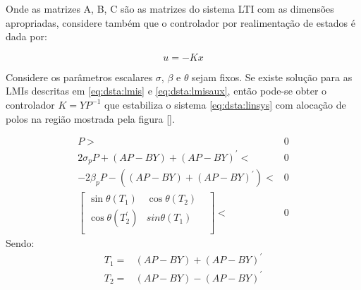 Onde as matrizes A, B, C são as matrizes do sistema LTI com as dimensões apropriadas, considere também que o controlador por realimentação de estados é dada por:

\begin{equation}
    u=-Kx  
\end{equation}

Considere os parâmetros escalares $\sigma$, $\beta$ e $\theta$ sejam fixos. Se existe solução para as LMIs descritas em \ref{eq:dsta:lmis} e \ref{eq:dsta:lmisaux}, então pode-se obter o controlador $K=YP^{-1}$ que estabiliza o sistema \ref{eq:dsta:linsys} com alocação de polos na região mostrada pela figura \ref{}.

\begin{equation}\label{eq:dsta:lmis}
    \begin{split}
        P>&0\\
         2\sigma_pP+(AP-BY)+(AP-BY)^'<&0\\
        -2\beta_pP-((AP-BY)+(AP-BY)^')<&0\\
        \begin{bmatrix}
            \sin{\theta}(T_1)&\cos{\theta}(T_2)&\\
            \cos{\theta}(T^'_2)&sin{\theta}(T_1)&\\
        \end{bmatrix}<&0
    \end{split}    
\end{equation}
Sendo:
\begin{equation}\label{eq:dsta:lmisaux}
    \begin{split}
        T_1=&(AP-BY)+(AP-BY)^'\\
        T_2=&(AP-BY)-(AP-BY)^'\\
    \end{split} 
\end{equation}